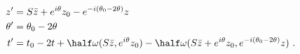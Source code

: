 \begin{equation}
  \label{eq:orbit-}
  \begin{aligned}
    z' &= S\bar z + e^{i\theta} z_0 - e^{-i(\theta_0-2\theta)} z\\
    \theta' &= \theta_0 - 2 \theta\\
    t' &= t_0 - 2 t + \half \omega(S\bar z, e^{i\theta}z_0) - \half
    \omega(S\bar z + e^{i\theta}z_0, e^{-i(\theta_0-2\theta)} z)~.
  \end{aligned}
\end{equation}

